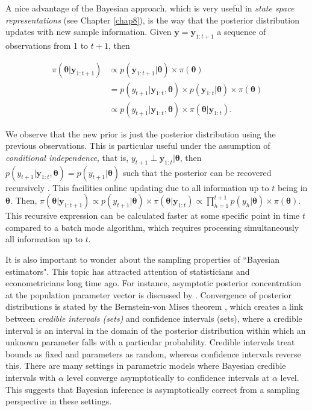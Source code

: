 A nice advantage of the Bayesian approach, which is very useful in \textit{state space representations} (see Chapter \ref{chap8}), is the way that the posterior distribution updates with new sample information. Given $\mathbf{y}=\mathbf{y}_{1:t+1}$ a sequence of observations from 1 to $t+1$, then

\begin{align}
	\pi(\mathbf{\theta}|\mathbf{y}_{1:t+1})&\propto p(\mathbf{y}_{1:t+1}|\mathbf{\theta})\times \pi(\mathbf{\theta})\nonumber\\
	&= p(y_{t+1}|\mathbf{y}_{1:t},\mathbf{\theta})\times p(\mathbf{y}_{1:t}|\mathbf{\theta})\times \pi(\mathbf{\theta})\nonumber\\
	&\propto p(y_{t+1}|\mathbf{y}_{1:t},\mathbf{\theta})\times \pi(\mathbf{\theta}|\mathbf{y}_{1:t}). 
\end{align}

We observe that the new prior is just the posterior distribution using the previous observations. This is particular useful under the assumption of \textit{conditional independence}, that is, $y_{t+1}\perp\mathbf{y}_{1:t}|\mathbf{\theta}$, then $p(y_{t+1}|\mathbf{y}_{1:t},\mathbf{\theta})=p(y_{t+1}|\mathbf{\theta})$ such that the posterior can be recovered recursively \cite{petris2009dynamic}. This facilities online updating due to all information up to $t$ being in $\mathbf{\theta}$. Then, $\pi(\mathbf{\theta}|\mathbf{y}_{1:t+1})\propto p(y_{t+1}|\mathbf{\theta})\times \pi(\mathbf{\theta}|\mathbf{y}_{1:t})\propto\prod_{h=1}^{t+1} p(y_h|\mathbf{\theta})\times \pi(\mathbf{\theta})$. This recursive expression can be calculated faster at some specific point in time $t$ compared to a batch mode algorithm, which requires processing simultaneously all information up to $t$.

It is also important to wonder about the sampling properties of ``Bayesian estimators". This topic has attracted attention of statisticians and econometricians long time ago. For instance, asymptotic posterior concentration at the population parameter vector is discussed by \cite{bickel1969some}. Convergence of posterior distributions is stated by the Bernstein-von Mises theorem \cite{Lehmann2003}, which creates a link between \textit{credible intervals (sets)} and confidence intervals (sets), where a credible interval is an interval in the domain of the posterior distribution within which an unknown parameter falls with a particular probability. Credible intervals treat bounds as fixed and parameters as random, whereas confidence intervals reverse this. There are many settings in parametric models where Bayesian credible intervals with $\alpha$ level converge asymptotically to confidence intervals at $\alpha$ level. This suggests that Bayesian inference is asymptotically correct from a sampling perspective in these settings.

